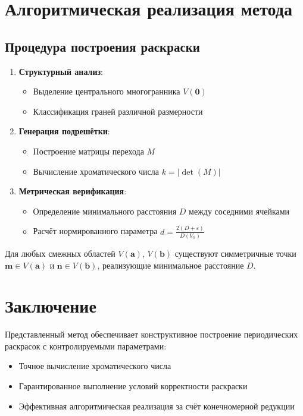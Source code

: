 \documentclass[12pt]{article}
\begin{document}
\section{Алгоритмическая реализация метода}

\subsection{Процедура построения раскраски}
\begin{enumerate}
\item \textbf{Структурный анализ}:
\begin{itemize}
\item Выделение центрального многогранника $V(\mathbf{0})$
\item Классификация граней различной размерности
\end{itemize}

\item \textbf{Генерация подрешётки}:
\begin{itemize}
\item Построение матрицы перехода $M$
\item Вычисление хроматического числа $k = |\det(M)|$
\end{itemize}

\item \textbf{Метрическая верификация}:
\begin{itemize}
\item Определение минимального расстояния $D$ между соседними ячейками
\item Расчёт нормированного параметра $d = \frac{2(D+\varepsilon)}{D(V_0)}$
\end{itemize}
\end{enumerate}

\begin{lemma}
Для любых смежных областей $V(\mathbf{a})$, $V(\mathbf{b})$ существуют симметричные точки $\mathbf{m}\in V(\mathbf{a})$ и $\mathbf{n}\in V(\mathbf{b})$, реализующие минимальное расстояние $D$.
\end{lemma}

\section*{Заключение}
Представленный метод обеспечивает конструктивное построение периодических раскрасок с контролируемыми параметрами:
\begin{itemize}
\item Точное вычисление хроматического числа
\item Гарантированное выполнение условий корректности раскраски
\item Эффективная алгоритмическая реализация за счёт конечномерной редукции
\end{itemize}
\end{document}
